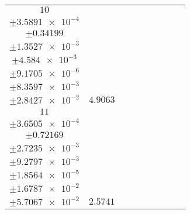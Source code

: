 \documentclass[8pt]{article}
\begin{document}
\begin{longtable}[l]{c c c c c c c c c}
$\num{10}$ & \begin{tabular}[c]{@{}c@{}}$\num{6.103e-2}$ \\ $\pm\num{3.5891e-4}$\end{tabular} & \begin{tabular}[c]{@{}c@{}}$\num{-0.18684}$ \\ $\pm\num{0.34199}$\end{tabular} & \begin{tabular}[c]{@{}c@{}}$\num{-4.2319}$ \\ $\pm\num{1.3527e-3}$\end{tabular} & \begin{tabular}[c]{@{}c@{}}$\num{2.1392e+3}$ \\ $\pm\num{4.584e-3}$\end{tabular} & \begin{tabular}[c]{@{}c@{}}$\num{4.2797}$ \\ $\pm\num{9.1705e-6}$\end{tabular} & \begin{tabular}[c]{@{}c@{}}$\num{1.1862}$ \\ $\pm\num{8.3597e-3}$\end{tabular} & \begin{tabular}[c]{@{}c@{}}$\num{4.2173}$ \\ $\pm\num{2.8427e-2}$\end{tabular} & $\num{4.9063}$\\
$\num{11}$ & \begin{tabular}[c]{@{}c@{}}$\num{2.9553e-2}$ \\ $\pm\num{3.6505e-4}$\end{tabular} & \begin{tabular}[c]{@{}c@{}}$\num{3.5945e-3}$ \\ $\pm\num{0.72169}$\end{tabular} & \begin{tabular}[c]{@{}c@{}}$\num{-0.90967}$ \\ $\pm\num{2.7235e-3}$\end{tabular} & \begin{tabular}[c]{@{}c@{}}$\num{2.1426e+3}$ \\ $\pm\num{9.2797e-3}$\end{tabular} & \begin{tabular}[c]{@{}c@{}}$\num{4.2863}$ \\ $\pm\num{1.8564e-5}$\end{tabular} & \begin{tabular}[c]{@{}c@{}}$\num{1.151}$ \\ $\pm\num{1.6787e-2}$\end{tabular} & \begin{tabular}[c]{@{}c@{}}$\num{4.167}$ \\ $\pm\num{5.7067e-2}$\end{tabular} & $\num{2.5741}$\\

\end{longtable}
\end{document}
